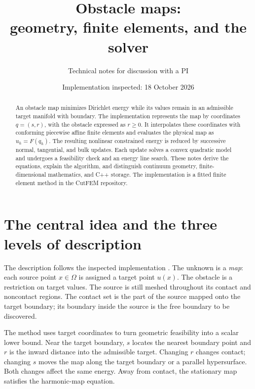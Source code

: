 \documentclass[11pt,a4paper]{article}
\title{Obstacle maps:\\geometry, finite elements, and the solver}
\author{Technical notes for discussion with a PI}
\date{Implementation inspected: 18 October 2026}
\begin{document}
\maketitle

\begin{abstract}
An obstacle map minimizes Dirichlet energy while its values remain in an
admissible target manifold with boundary. The implementation represents the
map by coordinates \(q=(s,r)\), with the obstacle expressed as \(r\geq0\).
It interpolates these coordinates with conforming piecewise affine finite
elements and evaluates the physical map as \(u_h=F(q_h)\). The resulting
nonlinear constrained energy is reduced by successive normal, tangential,
and bulk updates. Each update solves a convex quadratic model and undergoes
a feasibility check and an energy line search. These notes derive the
equations, explain the algorithm, and distinguish continuum geometry,
finite-dimensional mathematics, and C++ storage. The implementation is a
fitted finite element method in the CutFEM repository.
\end{abstract}

\tableofcontents
\clearpage

\section{The central idea and the three levels of description}
\label{sec:idea}

The description follows the inspected implementation \cite{implementation}.
The unknown is a \emph{map}: each source point \(x\in\Omega\) is assigned a
target point \(u(x)\). The obstacle is a restriction on target values.
The source is still meshed throughout its contact and noncontact regions.
The contact set is the part of the source mapped onto the target boundary;
its boundary inside the source is the free boundary to be discovered.

The method uses target coordinates to turn geometric feasibility into a
scalar lower bound. Near the target boundary, \(s\) locates the nearest
boundary point and \(r\) is the inward distance into the admissible target.
Changing \(r\) changes contact; changing \(s\) moves the map along the target
boundary or a parallel hypersurface. Both changes affect the same energy.
Away from contact, the stationary map satisfies the harmonic-map equation.
\end{document}
